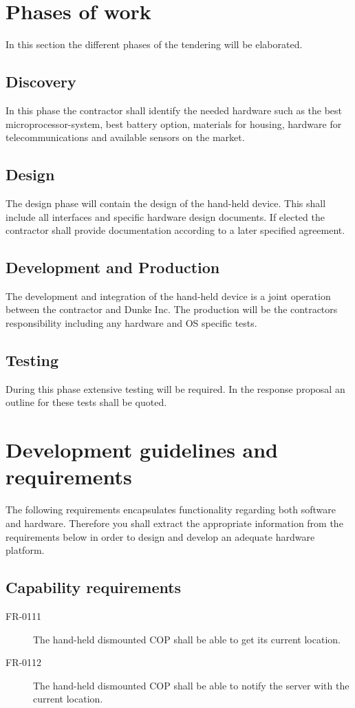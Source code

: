 \section{Phases of work}
In this section the different phases of the tendering will be elaborated. 

\subsection*{Discovery}
In this phase the contractor shall identify the needed hardware such as the best microprocessor-system, best battery option, materials for housing, hardware for telecommunications and available sensors on the market. 

\subsection*{Design}
The design phase will contain the design of the hand-held device. This shall include all interfaces and specific hardware design documents. 
If elected the contractor shall provide documentation according to a later specified agreement. 

\subsection*{Development and Production}
The development and integration of the hand-held device is a joint operation between the contractor and Dunke Inc. The production will be the contractors responsibility including any hardware and OS specific tests. 

\subsection*{Testing}
During this phase extensive testing will be required. In the response proposal an outline for these tests shall be quoted. 

\section{Development guidelines and requirements}
\label{sec:guidelines_and_requirements}
The following requirements encapsulates functionality regarding both software and hardware. Therefore you shall extract the appropriate information from the requirements below in order to design and develop an adequate hardware platform.

\subsection{Capability requirements}
\begin{description}
\item[FR-0111] The hand-held dismounted COP shall be able to get its current location.
\item[FR-0112] The hand-held dismounted COP shall be able to notify the server with the current location. 
\end{description}


